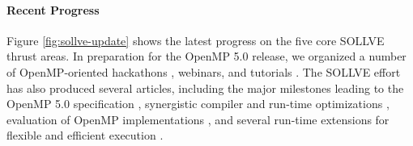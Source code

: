 \paragraph{Recent Progress}
Figure \ref{fig:sollve-update} shows the latest progress on the five core SOLLVE thrust areas. 
In preparation for the OpenMP 5.0 release, we organized a number of OpenMP-oriented hackathons 
\cite{bnl.knl-hackathon.2018,bnl.gpu-hackathon.2018}, webinars,
and tutorials 
\cite{sollve.ecp-am.tutorial.2018,sollve.ecp.webinar.2018,sollve.ecp-am.tutorial.2019,openmp.sc.tutorial.2018a,openmp.sc.tutorial.2018b}.
The SOLLVE effort has also produced several articles,
including the major milestones leading to the OpenMP 5.0 specification
\cite{openmp-tr6,openmp.spec.5.0}, 
synergistic compiler and run-time optimizations
\cite{zinenko.cc.2018,DBLP:conf/sc/MishraLKFC17,li.iwomp.2018,bertolacci.iwomp.2018,scogland.iwomp.2017,kruse.arxiv.2018b,kruse.arxiv.2018a,doerfert.iwomp.2018,kong.arxiv.2018},
evaluation of OpenMP implementations 
\cite{osti_1429981,openmpevol.2018, diaz.iwomp.2018,diaz.icpp.2018},
and several run-time extensions for flexible and efficient execution
\cite{seo2018,kemp.iwomp.2018,bolt.git,iwasaki2018}.

